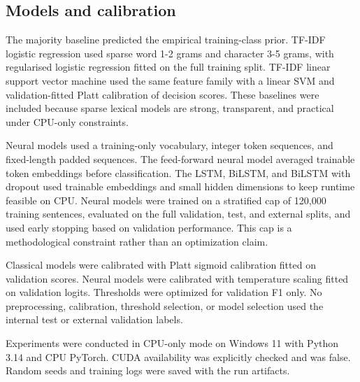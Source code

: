 \subsection*{Models and calibration}
The majority baseline predicted the empirical training-class prior. TF-IDF logistic regression used sparse word 1-2 grams and character 3-5 grams, with regularised logistic regression fitted on the full training split. TF-IDF linear support vector machine used the same feature family with a linear SVM and validation-fitted Platt calibration of decision scores. These baselines were included because sparse lexical models are strong, transparent, and practical under CPU-only constraints.

Neural models used a training-only vocabulary, integer token sequences, and fixed-length padded sequences. The feed-forward neural model averaged trainable token embeddings before classification. The LSTM, BiLSTM, and BiLSTM with dropout used trainable embeddings and small hidden dimensions to keep runtime feasible on CPU. Neural models were trained on a stratified cap of 120,000 training sentences, evaluated on the full validation, test, and external splits, and used early stopping based on validation performance. This cap is a methodological constraint rather than an optimization claim.

Classical models were calibrated with Platt sigmoid calibration fitted on validation scores. Neural models were calibrated with temperature scaling fitted on validation logits. Thresholds were optimized for validation F1 only. No preprocessing, calibration, threshold selection, or model selection used the internal test or external validation labels.

Experiments were conducted in CPU-only mode on Windows 11 with Python 3.14 and CPU PyTorch. CUDA availability was explicitly checked and was false. Random seeds and training logs were saved with the run artifacts.
